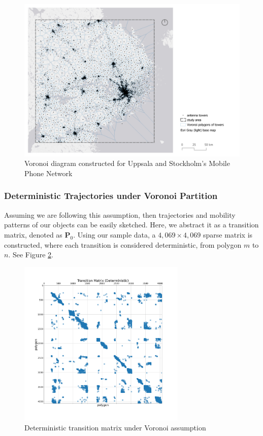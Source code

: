 \documentclass[12pt]{article}
\theoremstyle{definition}
\begin{document}
\begin{figure}
  \centering
  \includegraphics[width=14cm]{mpn_map.png}
  \caption{Voronoi diagram constructed for Uppsala and Stockholm's Mobile Phone Network}
  \label{fig:mpn_map}
\end{figure}


\subsubsection{Deterministic Trajectories under Voronoi Partition}
Assuming we are following this assumption, then trajectories and mobility patterns of our objects can be easily sketched. Here, we abstract it as a transition matrix, denoted as
\(\textbf{P}_0\). Using our sample data, a \(4,069 \times 4,069\) sparse matrix is constructed, where each transition is considered deterministic, from polygon \(m\) to \(n\). See Figure \ref{fig:determ_traj}.


\begin{figure}
  \centering
  \includegraphics[width=8cm]{determ_traj.png}
  \caption{Deterministic transition matrix under Voronoi assumption}
  \label{fig:determ_traj}
\end{figure}
\end{document}

